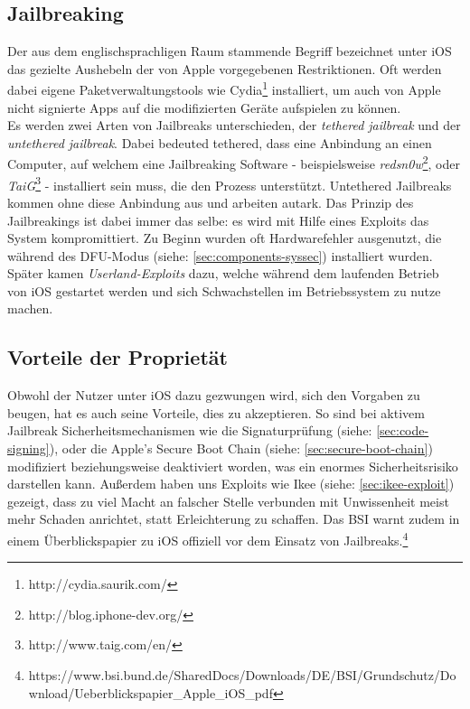 	\subsection{Jailbreaking}\label{sec:jailbreaking}
		Der aus dem englischsprachligen Raum stammende Begriff bezeichnet unter iOS
		das gezielte Aushebeln der von Apple vorgegebenen Restriktionen. Oft werden
		dabei eigene Paketverwaltungstools wie
		Cydia\footnote{http://cydia.saurik.com/} installiert, um auch von Apple nicht
		signierte Apps auf die modifizierten Geräte aufspielen zu können.\\
		Es werden zwei Arten von Jailbreaks unterschieden, der \textsl{tethered
		jailbreak} und der \textsl{untethered jailbreak}. Dabei bedeuted tethered,
		dass eine Anbindung an einen Computer, auf welchem eine Jailbreaking Software
		- beispielsweise \textsl{redsn0w}\footnote{http://blog.iphone-dev.org/}, oder
		\textsl{TaiG}\footnote{http://www.taig.com/en/} - installiert sein muss, die
		den Prozess unterstützt.
		Untethered Jailbreaks kommen ohne diese Anbindung aus und arbeiten autark.
		Das Prinzip des Jailbreakings ist dabei immer das selbe: es wird mit
		Hilfe eines Exploits das System kompromittiert. Zu Beginn wurden oft
		Hardwarefehler ausgenutzt, die während des
		DFU-Modus (siehe: \ref{sec:components-syssec}) installiert wurden.
		Später kamen \textsl{Userland-Exploits} dazu, welche während dem
		laufenden Betrieb von iOS gestartet werden und sich Schwachstellen im
		Betriebssystem zu nutze machen.
	
	\subsection{Vorteile der Proprietät}
		Obwohl der Nutzer unter iOS dazu gezwungen wird, sich den Vorgaben zu beugen,
		hat es auch seine Vorteile, dies zu akzeptieren. So sind bei aktivem Jailbreak
		Sicherheitsmechanismen wie die Signaturprüfung (siehe:
		\ref{sec:code-signing}), oder die Apple's Secure Boot
		Chain (siehe: \ref{sec:secure-boot-chain}) modifiziert beziehungsweise
		deaktiviert worden, was ein enormes Sicherheitsrisiko darstellen kann.
		Außerdem haben uns Exploits wie Ikee (siehe: \ref{sec:ikee-exploit}) gezeigt,
		dass zu viel Macht an falscher Stelle verbunden mit Unwissenheit meist mehr
		Schaden anrichtet, statt Erleichterung zu schaffen.
		Das BSI warnt zudem in einem Überblickspapier zu iOS offiziell vor dem Einsatz
		von Jailbreaks.\footnote{https://www.bsi.bund.de/SharedDocs/Downloads/DE/BSI/Grundschutz/Download/Ueberblickspapier\_Apple\_iOS\_pdf}
